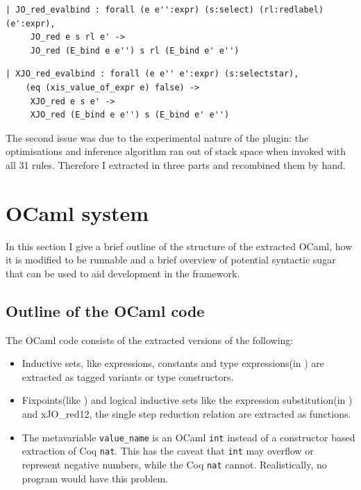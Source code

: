 \documentclass[12pt,twoside,notitlepage]{report}
\theoremstyle{plain}%
\theoremstyle{definition}
\theoremstyle{remark}
\begin{document}
\begin{minipage}{0.9\linewidth}

\begin{lstlisting}[language={Coq},caption={Coq reduction clause with unsafe assumption}, label={lst:coqredunsafe}]
| JO_red_evalbind : forall (e e'':expr) (s:select) (rl:redlabel) (e':expr),
     JO_red e s rl e' ->
     JO_red (E_bind e e'') s rl (E_bind e' e'')
\end{lstlisting}

\end{minipage}

\begin{minipage}{\linewidth}

\begin{lstlisting}[language={Coq},caption={Coq extractable reduction clause with safe assumption}, label={lst:coqxredsafe}]
 | XJO_red_evalbind : forall (e e'' e':expr) (s:selectstar),
    (eq (xis_value_of_expr e) false) ->
     XJO_red e s e' ->
     XJO_red (E_bind e e'') s (E_bind e' e'')
\end{lstlisting}

\end{minipage}


The second issue was due to the experimental nature of the plugin: the optimisations and inference algorithm ran out of stack space when invoked with all 31 rules. Therefore I extracted in three parts and recombined them by hand.

\section{OCaml system}
In this section I give a brief outline of the structure of the extracted OCaml, how it is modified to be runnable and a brief overview of potential syntactic sugar that can be used to aid development in the framework. 

\subsection{Outline of the OCaml code}
The OCaml code consists of the extracted versions of the following:
\begin{itemize}
\item{Inductive sets, like expressions, constants and type expressions(in ) are extracted as tagged variants or type constructors.}
\item{Fixpoints(like ) and logical inductive sets like the expression substitution(in ) and xJO\_red12, the single step reduction relation are extracted as functions.}
\item{The metavariable \verb|value_name| is an OCaml \lstinline|int| instead of a constructor based extraction of Coq \lstinline[language={Coq}]|nat|. This has the caveat that \lstinline|int| may overflow or represent negative numbers, while the Coq \lstinline[language={Coq}]|nat| cannot. Realistically, no program would have this problem.}
\end{itemize}
\end{document}
